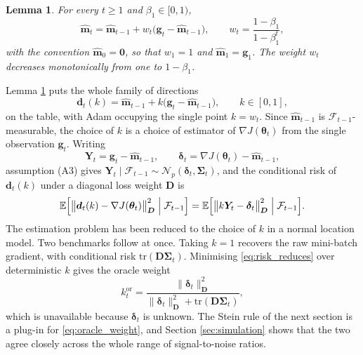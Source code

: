 \documentclass[pdflatex,sn-mathphys-num]{sn-jnl}%
\theoremstyle{thmstyleone}%
\theoremstyle{thmstyletwo}%
\newtheorem{lemma}{Lemma}%
\theoremstyle{thmstylethree}%
\newcommand{\tr}{\mathrm{tr}}
\newcommand{\E}{\mathbb{E}}
\begin{document}
\begin{lemma}
\label{lem:adam_identity}
For every $t\ge1$ and $\beta_1\in[0,1)$,
\begin{equation}
\hat{\bm m}_t=\hat{\bm m}_{t-1}+w_t\bigl(\bm g_t-\hat{\bm m}_{t-1}\bigr),
\qquad
w_t=\frac{1-\beta_1}{1-\beta_1^{t}},
\end{equation}
with the convention $\hat{\bm m}_0=\bm 0$, so that $w_1=1$ and $\hat{\bm m}_1=\bm g_1$. The weight $w_t$ decreases monotonically from one to $1-\beta_1$.
\end{lemma}

Lemma \ref{lem:adam_identity} puts the whole family of directions
\begin{equation}
\label{eq:direction_family}
\bm d_t(k)=\hat{\bm m}_{t-1}+k\bigl(\bm g_t-\hat{\bm m}_{t-1}\bigr),
\qquad
k\in[0,1],
\end{equation}
on the table, with Adam occupying the single point $k=w_t$. Since $\hat{\bm m}_{t-1}$ is $\mathcal F_{t-1}$-measurable, the choice of $k$ is a choice of estimator of $\nabla J(\bm\theta_t)$ from the single observation $\bm g_t$. Writing
\begin{equation}
\label{eq:Ydelta}
\bm Y_t=\bm g_t-\hat{\bm m}_{t-1},
\qquad
\bm\delta_t=\nabla J(\bm\theta_t)-\hat{\bm m}_{t-1},
\end{equation}
assumption (A3) gives $\bm Y_t\mid\mathcal F_{t-1}\sim\mathcal N_p(\bm\delta_t,\bm\Sigma_t)$, and the conditional risk of $\bm d_t(k)$ under a diagonal loss weight $\bm D$ is
\begin{equation}
\label{eq:risk_reduces}
\E\Bigl[\bigl\|\bm d_t(k)-\nabla J(\bm\theta_t)\bigr\|^2_{\bm D}\;\Big|\;\mathcal F_{t-1}\Bigr]
=
\E\Bigl[\bigl\|k\bm Y_t-\bm\delta_t\bigr\|^2_{\bm D}\;\Big|\;\mathcal F_{t-1}\Bigr].
\end{equation}
The estimation problem has been reduced to the choice of $k$ in a normal location model. Two benchmarks follow at once. Taking $k=1$ recovers the raw mini-batch gradient, with conditional risk $\tr(\bm D\bm\Sigma_t)$. Minimising \eqref{eq:risk_reduces} over deterministic $k$ gives the oracle weight
\begin{equation}
\label{eq:oracle_weight}
k^{\mathrm{or}}_t=\frac{\|\bm\delta_t\|^2_{\bm D}}{\|\bm\delta_t\|^2_{\bm D}+\tr(\bm D\bm\Sigma_t)},
\end{equation}
which is unavailable because $\bm\delta_t$ is unknown. The Stein rule of the next section is a plug-in for \eqref{eq:oracle_weight}, and Section \ref{sec:simulation} shows that the two agree closely across the whole range of signal-to-noise ratios.
\end{document}
